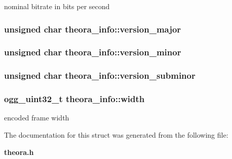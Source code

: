 nominal bitrate in bits per second 

\subsubsection[{version\-\_\-major}]{\setlength{\rightskip}{0pt plus 5cm}unsigned char theora\-\_\-info\-::version\-\_\-major}\label{structtheora__info_a7c5ebb9e6700aaef87f29f7c6074e474}
\subsubsection[{version\-\_\-minor}]{\setlength{\rightskip}{0pt plus 5cm}unsigned char theora\-\_\-info\-::version\-\_\-minor}\label{structtheora__info_a75eda4f30270d833c7b9dba43932a06a}
\subsubsection[{version\-\_\-subminor}]{\setlength{\rightskip}{0pt plus 5cm}unsigned char theora\-\_\-info\-::version\-\_\-subminor}\label{structtheora__info_aa07967ecd6e20bd2928ead42b6397b3d}
\subsubsection[{width}]{\setlength{\rightskip}{0pt plus 5cm}ogg\-\_\-uint32\-\_\-t theora\-\_\-info\-::width}\label{structtheora__info_a17c2fc651bb3329f1ea6b13ff1d3957b}


encoded frame width 



The documentation for this struct was generated from the following file\-:\begin{DoxyCompactItemize}
\item 
{\bf theora.\-h}\end{DoxyCompactItemize}
